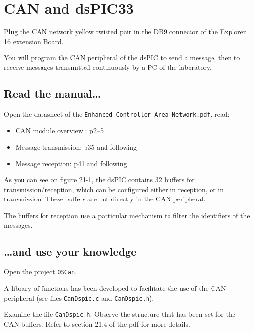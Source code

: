 \documentclass[10pt,a4paper]{article}
\theoremstyle{definition}%
\newcommand{\kw}[1]{\texttt{#1}}
\begin{document}
\section{CAN and dsPIC33}
Plug the CAN network yellow twisted pair in the DB9 connector of the Explorer 16 extension Board.

You will program the CAN peripheral of the dsPIC to send a message, then to
receive messages transmitted continuously by a PC of the laboratory.

\subsection{Read the manual\dots}
Open the datasheet of the \kw{Enhanced Controller Area Network.pdf}, read:
\begin{itemize}
\item CAN module overview : p2--5
\item Message transmission: p35 and following
\item Message reception: p41 and following
\end{itemize}


As you can see on figure 21-1, the dsPIC contains 32 buffers for transmission/reception, which can
be configured either in reception, or in transmission. These buffers are not directly in the CAN
peripheral. 


The buffers for reception use a particular mechanism to filter the identifiers of the messages. 



\subsection{\dots and use your knowledge}
Open the project \kw{OSCan}.

A library of functions has been developed to facilitate the use of the CAN peripheral (see files
\kw{CanDspic.c} and \kw{CanDspic.h}).

Examine the file \kw{CanDspic.h}. Observe the structure that has been set for the CAN buffers.
Refer to section 21.4 of the pdf for more details.

\end{document}
